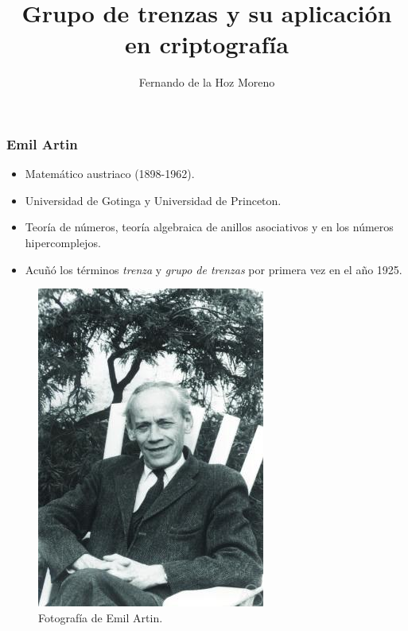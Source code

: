 \documentclass{beamer}
\begin{document}
\title{Grupo de trenzas y su aplicación en criptografía}   
\author{Fernando de la Hoz Moreno} 
\date{} 

\frame{\titlepage} 







\begin{frame}
\frametitle{Emil Artin} 

\begin{minipage}{.5\textwidth}

\begin{itemize}
\item Matemático austriaco (1898-1962).
\item Universidad de Gotinga y Universidad de Princeton.
\item Teoría de números, teoría algebraica de anillos asociativos y en los números hipercomplejos.
\item Acuñó los términos \textit{trenza} y \textit{grupo de trenzas} por primera vez en el año 1925.
\end{itemize}


\end{minipage}\hfill
\begin{minipage}{.5\textwidth}
\begin{figure}
\includegraphics[height=0.9\textwidth]{imgs/EmilArtin}
\caption{Fotografía de Emil Artin.}
\end{figure}
\end{minipage}

\end{frame}
\end{document}
